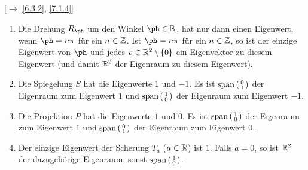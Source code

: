\documentclass[../../main.tex]{subfiles}
\begin{document}
\begin{bsp}\label{10.1.3}
[$\to$ \ref{6.3.2}, \ref{7.1.4}]
\begin{enumerate}[\normalfont(a)]
\item Die Drehung $R_\ph$ um den Winkel $\ph\in \R$, hat nur dann einen Eigenwert, wenn $\ph = n\pi$ für ein $n\in \mathbb Z$. Ist $\ph = n\pi$ für ein  $n\in \mathbb Z$, so ist  der einzige Eigenwert von $\ph$ und jedes $v\in \mathbb R^2\setminus\left\{0\right\}$ ein Eigenvektor zu diesem Eigenwert (und damit $\mathbb R^2$ der Eigenraum zu diesem Eigenwert).
\item Die Spiegelung $S$ hat die Eigenwerte $1$ und $-1$. Es ist $\operatorname{span}\left(\begin{smallmatrix}0\\1\end{smallmatrix}\right)$ der Eigenraum zum Eigenwert $1$ und $\operatorname{span}\left(\begin{smallmatrix}1\\0\end{smallmatrix}\right)$ der Eigenraum zum Eigenwert $-1$.
\item Die Projektion $P$ hat die Eigenwerte $1$ und $0$. Es ist $\operatorname{span}\left(\begin{smallmatrix}1\\0\end{smallmatrix}\right)$ der Eigenraum zum Eigenwert $1$ und $\operatorname{span}\left(\begin{smallmatrix}0\\1\end{smallmatrix}\right)$ der Eigenraum zum Eigenwert $0$.
\item Der einzige Eigenwert der Scherung $T_a$ ($a\in \mathbb R$) ist $1$. Falls $a = 0$, so ist $\mathbb R^2$ der dazugehörige Eigenraum, sonst $\operatorname{span}\left(\begin{smallmatrix}1\\0\end{smallmatrix}\right)$.
\begin{center}
\end{center}
\end{enumerate}
\end{bsp}
\end{document}
